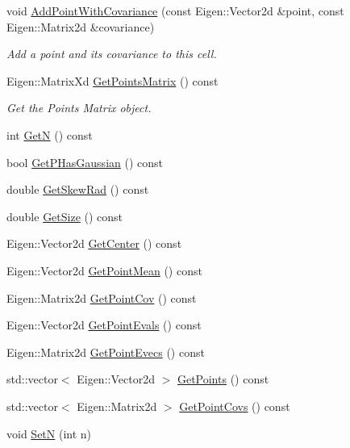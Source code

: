 \begin{DoxyCompactItemize}
void \hyperlink{classCellInterface_a8db8c78e18327c3427ce8981f520eb6b}{Add\+Point\+With\+Covariance} (const Eigen\+::\+Vector2d \&point, const Eigen\+::\+Matrix2d \&covariance)
\begin{DoxyCompactList}\small\item\em Add a point and its covariance to this cell. \end{DoxyCompactList}\item 
Eigen\+::\+Matrix\+Xd \hyperlink{classCellInterface_abf249487edef6811dda54d7b3ee9d710}{Get\+Points\+Matrix} () const
\begin{DoxyCompactList}\small\item\em Get the Points Matrix object. \end{DoxyCompactList}\item 
int \hyperlink{classCellInterface_a26eed7e87ee176e0f4fd256711d6dbfe}{GetN} () const
\item 
bool \hyperlink{classCellInterface_aca65971da680ab3e5f7e68d5444b50f8}{Get\+P\+Has\+Gaussian} () const
\item 
double \hyperlink{classCellInterface_a4d88613aaecc01f7e21b4efd9e554e95}{Get\+Skew\+Rad} () const
\item 
double \hyperlink{classCellInterface_a21bb156a72ad4502808efaab900094d3}{Get\+Size} () const
\item 
Eigen\+::\+Vector2d \hyperlink{classCellInterface_a30f7080f19cd592cc0c478d910870858}{Get\+Center} () const
\item 
Eigen\+::\+Vector2d \hyperlink{classCellInterface_a8eecc9d9e5e3d6c327c830f15d0e4bed}{Get\+Point\+Mean} () const
\item 
Eigen\+::\+Matrix2d \hyperlink{classCellInterface_a774cd7acb975d19866616540357c8974}{Get\+Point\+Cov} () const
\item 
Eigen\+::\+Vector2d \hyperlink{classCellInterface_a901b89d5b89a4029d41b97ce2ac380a8}{Get\+Point\+Evals} () const
\item 
Eigen\+::\+Matrix2d \hyperlink{classCellInterface_a727b6d5c67e6628db2edbe00df6d2b05}{Get\+Point\+Evecs} () const
\item 
std\+::vector$<$ Eigen\+::\+Vector2d $>$ \hyperlink{classCellInterface_a011b22b778a1cac212becf05c204c48e}{Get\+Points} () const
\item 
std\+::vector$<$ Eigen\+::\+Matrix2d $>$ \hyperlink{classCellInterface_a8f2a59b5ee0c5e9971751e9475b8946e}{Get\+Point\+Covs} () const
\item 
void \hyperlink{classCellInterface_af19ae9871342b22b3a3fb59c850cff8b}{SetN} (int n)

\end{DoxyCompactItemize}
